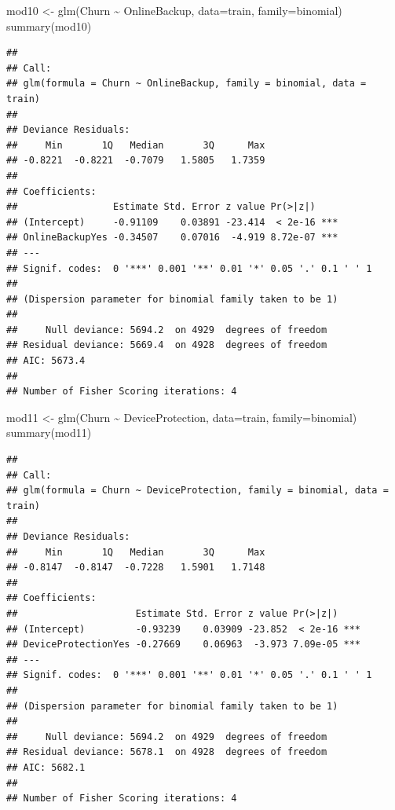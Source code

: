 \documentclass[
  twoside]{article}
\newenvironment{Shaded}{\begin{snugshade}}{\end{snugshade}}
\newcommand{\AttributeTok}[1]{\textcolor[rgb]{0.77,0.63,0.00}{#1}}
\newcommand{\FunctionTok}[1]{\textcolor[rgb]{0.00,0.00,0.00}{#1}}
\newcommand{\NormalTok}[1]{#1}
\newcommand{\OtherTok}[1]{\textcolor[rgb]{0.56,0.35,0.01}{#1}}
\newcommand{\SpecialCharTok}[1]{\textcolor[rgb]{0.00,0.00,0.00}{#1}}
\begin{document}
\begin{Shaded}
\begin{Highlighting}[]
\NormalTok{mod10 }\OtherTok{\textless{}{-}} \FunctionTok{glm}\NormalTok{(Churn }\SpecialCharTok{\textasciitilde{}}\NormalTok{ OnlineBackup, }\AttributeTok{data=}\NormalTok{train, }\AttributeTok{family=}\NormalTok{binomial)}
\FunctionTok{summary}\NormalTok{(mod10)}
\end{Highlighting}
\end{Shaded}

\begin{verbatim}
## 
## Call:
## glm(formula = Churn ~ OnlineBackup, family = binomial, data = train)
## 
## Deviance Residuals: 
##     Min       1Q   Median       3Q      Max  
## -0.8221  -0.8221  -0.7079   1.5805   1.7359  
## 
## Coefficients:
##                 Estimate Std. Error z value Pr(>|z|)    
## (Intercept)     -0.91109    0.03891 -23.414  < 2e-16 ***
## OnlineBackupYes -0.34507    0.07016  -4.919 8.72e-07 ***
## ---
## Signif. codes:  0 '***' 0.001 '**' 0.01 '*' 0.05 '.' 0.1 ' ' 1
## 
## (Dispersion parameter for binomial family taken to be 1)
## 
##     Null deviance: 5694.2  on 4929  degrees of freedom
## Residual deviance: 5669.4  on 4928  degrees of freedom
## AIC: 5673.4
## 
## Number of Fisher Scoring iterations: 4
\end{verbatim}

\begin{Shaded}
\begin{Highlighting}[]
\NormalTok{mod11 }\OtherTok{\textless{}{-}} \FunctionTok{glm}\NormalTok{(Churn }\SpecialCharTok{\textasciitilde{}}\NormalTok{ DeviceProtection, }\AttributeTok{data=}\NormalTok{train, }\AttributeTok{family=}\NormalTok{binomial)}
\FunctionTok{summary}\NormalTok{(mod11)}
\end{Highlighting}
\end{Shaded}

\begin{verbatim}
## 
## Call:
## glm(formula = Churn ~ DeviceProtection, family = binomial, data = train)
## 
## Deviance Residuals: 
##     Min       1Q   Median       3Q      Max  
## -0.8147  -0.8147  -0.7228   1.5901   1.7148  
## 
## Coefficients:
##                     Estimate Std. Error z value Pr(>|z|)    
## (Intercept)         -0.93239    0.03909 -23.852  < 2e-16 ***
## DeviceProtectionYes -0.27669    0.06963  -3.973 7.09e-05 ***
## ---
## Signif. codes:  0 '***' 0.001 '**' 0.01 '*' 0.05 '.' 0.1 ' ' 1
## 
## (Dispersion parameter for binomial family taken to be 1)
## 
##     Null deviance: 5694.2  on 4929  degrees of freedom
## Residual deviance: 5678.1  on 4928  degrees of freedom
## AIC: 5682.1
## 
## Number of Fisher Scoring iterations: 4
\end{verbatim}
\end{document}
